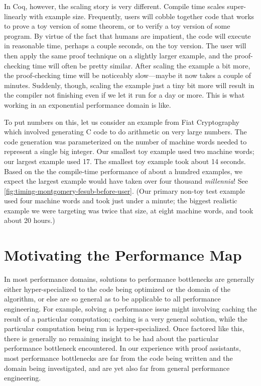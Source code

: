 In Coq, however, the scaling story is very different.
Compile time scales super-linearly with example size.
Frequently, users will cobble together code that works to prove a toy version of some theorem, or to verify a toy version of some program.
By virtue of the fact that humans are impatient, the code will execute in reasonable time, perhaps a couple seconds, on the toy version.
The user will then apply the same proof technique on a slightly larger example, and the proof-checking time will often be pretty similar.
After scaling the example a bit more, the proof-checking time will be noticeably slow---maybe it now takes a couple of minutes.
Suddenly, though, scaling the example just a tiny bit more will result in the compiler not finishing even if we let it run for a day or more.
This is what working in an exponential performance domain is like.

To put numbers on this, let us consider an example from Fiat Cryptography which involved generating C code to do arithmetic on very large numbers.
The code generation was parameterized on the number of machine words needed to represent a single big integer.
Our smallest toy example used two machine words; our largest example used 17.
The smallest toy example took about 14 seconds.
Based on the the compile-time performance of about a hundred examples, we expect the largest example would have taken over four thousand \emph{millennia}!
See \autoref{fig:timing-montgomery-fesub-before-user}.
(Our primary non-toy test example used four machine words and took just under a minute; the biggest realistic example we were targeting was twice that size, at eight machine words, and took about 20 hours.)

\section{Motivating the Performance Map}%

In most performance domains, solutions to performance bottlenecks are generally either hyper-specialized to the code being optimized or the domain of the algorithm, or else are so general as to be applicable to all performance engineering.
For example, solving a performance issue might involving caching the result of a particular computation; caching is a very general solution, while the particular computation being run is hyper-specialized.
Once factored like this, there is generally no remaining insight to be had about the particular performance bottleneck encountered.
In our experience with proof assistants, most performance bottlenecks are far from the code being written and the domain being investigated, and are yet also far from general performance engineering.

